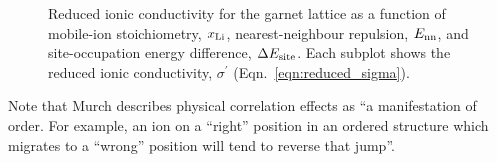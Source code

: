 \documentclass[aps,prb,twocolumn,superscriptaddress,reprint]{revtex4-1}
\newcommand{\xLi}{x_\m{Li}}
\begin{document}
\begin{figure}[tb]
  \centering
    \caption{\label{fig:conductivity_miniplots}Reduced ionic conductivity for the garnet lattice as a function of mobile-ion stoichiometry, $\xLi$, nearest-neighbour repulsion, $E_{\mathrm{nn}}$, and site-occupation energy difference, $\Delta E_{\mathrm{site}}$. Each subplot shows the reduced ionic conductivity, $\sigma^\prime$ (Eqn.~\ref{eqn:reduced_sigma}).}
\end{figure}

Note that Murch describes physical correlation effects as ``a manifestation of order. For example, an ion on a ``right'' position in an ordered structure which migrates to a ``wrong'' position will tend to reverse that jump''.\cite{Murch_SolStatIonics1982}


\end{document}
